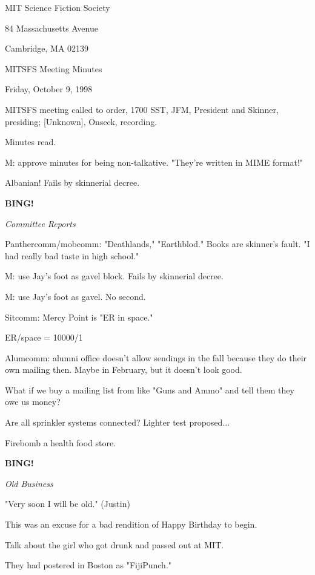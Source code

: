 \documentclass[12pt]{article}
\newcommand{\bing}{{\bf BING!} }
\newcommand{\goto}[1]{\bing \vskip 12pt \centerline{{\em{#1}}}}
\begin{document}
\begin{center}

MIT Science Fiction Society 

84 Massachusetts Avenue

Cambridge, MA 02139

\vspace{12pt}

MITSFS Meeting Minutes 

Friday, October 9, 1998

\end{center}
 
\vspace{18pt}

\setlength{\parskip}{6pt}

\noindent
MITSFS meeting called to order, 1700 SST,
JFM, President and Skinner, presiding; [Unknown], Onseck, recording.

Minutes read.

M: approve minutes for being non-talkative. "They're written in MIME format!"

Albanian! Fails by skinnerial decree.

\goto{Committee Reports}

Panthercomm/mobcomm: "Deathlands," "Earthblod." Books are skinner's fault. "I had really bad taste in high school."

M: use Jay's foot as gavel block. Fails by skinnerial decree.

M: use Jay's foot as gavel. No second.

Sitcomm: Mercy Point is "ER in space."

ER/space = 10000/1

Alumcomm: alumni office doesn't allow sendings in the fall because they do their own mailing then. Maybe in February, but it doesn't look good.

What if we buy a mailing list from like "Guns and Ammo" and tell them they owe us money?

Are all sprinkler systems connected? Lighter test proposed...

Firebomb a health food store.

\goto{Old Business}

"Very soon I will be old." (Justin)

This was an excuse for a bad rendition of Happy Birthday to begin.

Talk about the girl who got drunk and passed out at MIT.

They had postered in Boston as "FijiPunch."
\end{document}
